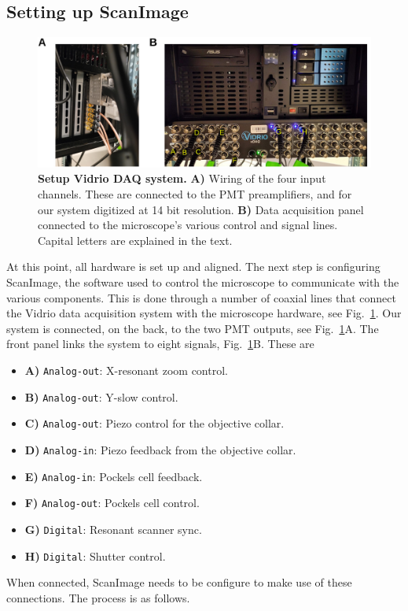 \documentclass[10pt,letterpaper]{article}
\begin{document}
\subsection{Setting up ScanImage}
%
\begin{figure}[t]
    \includegraphics[width=\textwidth]{sfig13.jpg}
  \caption{{\bf Setup Vidrio DAQ system.} \textbf{A)} Wiring of the four input channels. These are connected to the PMT preamplifiers, and for our system digitized at 14 bit resolution. \textbf{B)} Data acquisition panel connected to the microscope's various control and signal lines. Capital letters are explained in the text.}
  \label{sfig13}
\end{figure}
%
At this point, all hardware is set up and aligned. The next step is configuring ScanImage, the software used to control the microscope \cite{Pologruto2003, Vidrio2022} to communicate with the various components. This is done through a number of coaxial lines that connect the Vidrio data acquisition system with the microscope hardware, see Fig.~\ref{sfig13}. Our system is connected, on the back, to the two PMT outputs, see Fig.~\ref{sfig13}A. The front panel links the system to eight signals, Fig.~\ref{sfig13}B. These are
\begin{itemize}
    \item \textbf{A)} \texttt{Analog-out}: X-resonant zoom control.
    \item \textbf{B)} \texttt{Analog-out}: Y-slow control.
    \item \textbf{C)} \texttt{Analog-out}: Piezo control for the objective collar.
    \item \textbf{D)} \texttt{Analog-in}: Piezo feedback from the objective collar.
    \item \textbf{E)} \texttt{Analog-in}: Pockels cell feedback.
    \item \textbf{F)} \texttt{Analog-out}: Pockels cell control.
    \item \textbf{G)} \texttt{Digital}: Resonant scanner sync.
    \item \textbf{H)} \texttt{Digital}: Shutter control.
\end{itemize} 
%
When connected, ScanImage needs to be configure to make use of these connections. The process is as follows.
\end{document}
